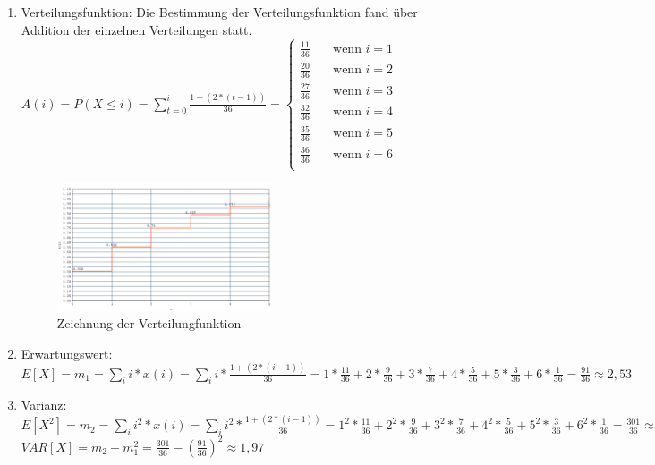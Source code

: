 \documentclass[%
10pt,              %
ngerman,           %
a4paper,           %
DIV11,             %
]{scrartcl}%
\begin{document}
\begin{enumerate}
	\item Verteilungsfunktion: Die Bestimmung der Verteilungsfunktion fand über Addition der einzelnen Verteilungen statt.\newline
	$A(i) = P(X \leq i) = \sum_{t=0}^i\frac{1 + (2 * (t - 1))}{36} = 
    \begin{cases}
        \frac{11}{36}& \quad \text{wenn } i = 1\\
        \frac{20}{36} & \quad \text{wenn } i = 2\\
        \frac{27}{36} & \quad \text{wenn } i = 3\\
        \frac{32}{36} & \quad \text{wenn } i = 4\\
        \frac{35}{36} & \quad \text{wenn } i = 5\\
        \frac{36}{36} & \quad \text{wenn } i = 6\\
    \end{cases}
    $ \\
    \begin{figure}[!htbp]
      \centering
        \caption{Zeichnung der Verteilungfunktion}
        \includegraphics[width=0.6\textwidth]{xminvertfkt}
    \end{figure}
	
	\item Erwartungswert: $E[X] = m_1 = \sum_{i}i * x(i) = \sum_{i}i * \frac{1 + (2 * (i - 1))}{36} = 1 * \frac{11}{36} + 2 * \frac{9}{36} + 3 * \frac{7}{36} + 4 * \frac{5}{36} + 5 * \frac{3}{36} + 6 * \frac{1}{36} = \frac{91}{36} \approx 2,53$\newline
    \item Varianz: $E[X^2] = m_2 = \sum_{i}i^2 * x(i) = \sum_{i}i^2 * \frac{1 + (2 * (i - 1))}{36} = 1^2 * \frac{11}{36} + 2^2 * \frac{9}{36} + 3^2 * \frac{7}{36} + 4^2 * \frac{5}{36} + 5^2 * \frac{3}{36} + 6^2 * \frac{1}{36} = \frac{301}{36} \approx 8.36$
    \\
    $VAR[X] = m_2 - m_1^2 = \frac{301}{36} - (\frac{91}{36})^2 \approx 1,97$ 
\end{enumerate}
\end{document}
